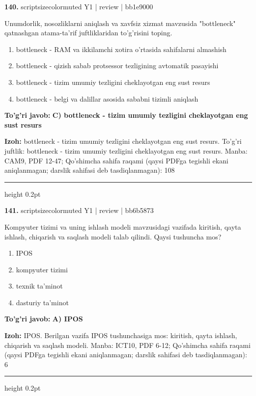 \documentclass[10pt,a4paper]{article}
\begin{document}
{\bfseries\sffamily\color{ink} 140.} {scriptsizecolor{muted} Y1 | review | bb1e9000}
\par
Unumdorlik, nosozliklarni aniqlash va xavfsiz xizmat mavzusida "bottleneck" qatnashgan atama-ta'rif juftliklaridan to'g'risini toping.
\begin{enumerate}[label=\Alph*),leftmargin=9mm]
\item bottleneck - RAM va ikkilamchi xotira o'rtasida sahifalarni almashish
\item bottleneck - qizish sabab protsessor tezligining avtomatik pasayishi
\item bottleneck - tizim umumiy tezligini cheklayotgan eng sust resurs
\item bottleneck - belgi va dalillar asosida sababni tizimli aniqlash
\end{enumerate}
\begin{tcolorbox}[enhanced,breakable,colback=teal!4,colframe=teal!60!black,boxrule=0.45pt,arc=1.2mm,left=2.7mm,right=2.7mm,top=1.8mm,bottom=1.8mm,before skip=2mm,after skip=2mm]
{\bfseries\sffamily\color{teal}To'g'ri javob:} \textbf{C) bottleneck - tizim umumiy tezligini cheklayotgan eng sust resurs}
\par\smallskip
{\bfseries Izoh:} bottleneck - tizim umumiy tezligini cheklayotgan eng sust resurs. To'g'ri juftlik: bottleneck - tizim umumiy tezligini cheklayotgan eng sust resurs. Manba: CAM9, PDF 12-47; Qo'shimcha sahifa raqami (qaysi PDFga tegishli ekani aniqlanmagan; darslik sahifasi deb tasdiqlanmagan): 108
\end{tcolorbox}
\vspace{2mm}\hrule height 0.2pt\vspace{3mm}

{\bfseries\sffamily\color{ink} 141.} {scriptsizecolor{muted} Y1 | review | bb6b5873}
\par
Kompyuter tizimi va uning ishlash modeli mavzusidagi vazifada kiritish, qayta ishlash, chiqarish va saqlash modeli talab qilindi. Qaysi tushuncha mos?
\begin{enumerate}[label=\Alph*),leftmargin=9mm]
\item IPOS
\item kompyuter tizimi
\item texnik ta'minot
\item dasturiy ta'minot
\end{enumerate}
\begin{tcolorbox}[enhanced,breakable,colback=teal!4,colframe=teal!60!black,boxrule=0.45pt,arc=1.2mm,left=2.7mm,right=2.7mm,top=1.8mm,bottom=1.8mm,before skip=2mm,after skip=2mm]
{\bfseries\sffamily\color{teal}To'g'ri javob:} \textbf{A) IPOS}
\par\smallskip
{\bfseries Izoh:} IPOS. Berilgan vazifa IPOS tushunchasiga mos: kiritish, qayta ishlash, chiqarish va saqlash modeli. Manba: ICT10, PDF 6-12; Qo'shimcha sahifa raqami (qaysi PDFga tegishli ekani aniqlanmagan; darslik sahifasi deb tasdiqlanmagan): 6
\end{tcolorbox}
\vspace{2mm}\hrule height 0.2pt\vspace{3mm}
\end{document}
